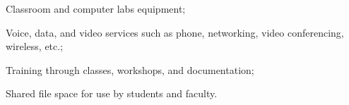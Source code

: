 \medskip 
\begin{compactitem}
  \item Classroom and computer labs equipment;
  \item Voice, data, and video services such as phone, networking, video
    conferencing, wireless, etc.; 
  \item Training through classes, workshops, and documentation;
  \item Shared file space for use by students and faculty.
  \end{compactitem}



